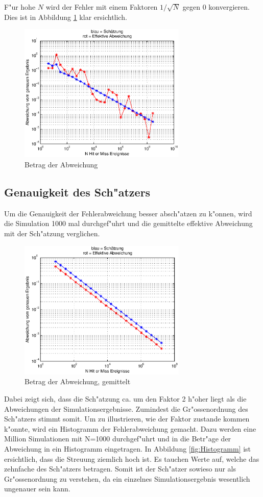 \begin{refsection}
F"ur hohe $N$ wird der Fehler mit einem Faktoren $1 / \sqrt{N}$ gegen $0$
konvergieren. Dies ist in Abbildung \ref{fig:Fehler} klar ersichtlich.

\begin{figure}[ht!]
    \centering
    \includegraphics[width=8cm]{montecarlo/images/Fehler.eps}
    \caption{Betrag der Abweichung}
    \label{fig:Fehler}
\end{figure}

\subsection{Genauigkeit des Sch"atzers}

Um die Genauigkeit der Fehlerabweichung besser absch"atzen zu k"onnen,
wird die Simulation 1000 mal durchgef"uhrt und die gemittelte effektive
Abweichung mit der Sch"atzung verglichen.

\begin{figure}[ht!]
    \centering
    \includegraphics[width=8cm]{montecarlo/images/Fehler_gemittelt.eps}
    \caption{Betrag der Abweichung, gemittelt}
    \label{fig:Fehler_gemittelt}
\end{figure}

Dabei zeigt sich, dass die Sch"atzung ca. um den Faktor 2 h"oher liegt als
die Abweichungen der Simulationsergebnisse. Zumindest die Gr"ossenordnung
des Sch"atzers stimmt somit. Um zu illustrieren, wie der Faktor zustande
kommen k"onnte, wird ein Histogramm der Fehlerabweichung gemacht. Dazu
werden eine Million Simulationen mit N=1000 durchgef"uhrt und in die
Betr"age der Abweichung in ein Histogramm eingetragen. In Abbildung
\ref{fig:Histogramm} ist ersichtlich, dass die Streuung ziemlich
hoch ist. Es tauchen Werte auf, welche das zehnfache des Sch"atzers
betragen. Somit ist der Sch"atzer sowieso nur als Gr"ossenordnung zu
verstehen, da ein einzelnes Simulationsergebnis wesentlich ungenauer
sein kann.


\end{refsection}
